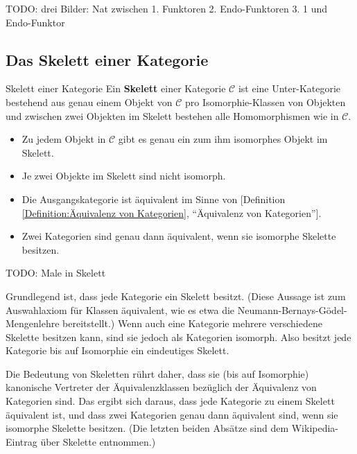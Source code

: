 \documentclass[a4paper]{amsart}
\theoremstyle{definition}
\newcommand{\myRef}[2]{[#1 \ref{#1:#2}, ``#2'']}
\newcommand{\CC}{\ensuremath{\mathcal{ C }}}
\begin{document}
TODO: drei Bilder: Nat zwischen 1. Funktoren 2. Endo-Funktoren 3. 1 und Endo-Funktor


\subsection{Das Skelett einer Kategorie}
\begin{Definition}{Skelett einer Kategorie}
   Ein \textbf{Skelett} einer Kategorie $\CC$ ist eine Unter-Kategorie bestehend aus genau einem Objekt von $\CC$ pro Isomorphie-Klassen von Objekten und zwischen zwei Objekten im Skelett bestehen alle Homomorphismen wie in $\CC$.
\end{Definition}

\begin{itemize}
   \item Zu jedem Objekt in $\CC$ gibt es genau ein zum ihm isomorphes Objekt im Skelett.
   \item Je zwei Objekte im Skelett sind nicht isomorph.
   \item Die Ausgangskategorie ist äquivalent im Sinne von \myRef{Definition}{Äquivalenz von Kategorien}.
   \item Zwei Kategorien sind genau dann äquivalent, wenn sie isomorphe Skelette besitzen.
\end{itemize}

TODO: Male in Skelett

Grundlegend ist, dass jede Kategorie ein Skelett besitzt. (Diese Aussage ist zum Auswahlaxiom für Klassen äquivalent, wie es etwa die Neumann-Bernays-Gödel-Mengenlehre bereitstellt.) Wenn auch eine Kategorie mehrere verschiedene Skelette besitzen kann, sind sie jedoch als Kategorien isomorph. Also besitzt jede Kategorie bis auf Isomorphie ein eindeutiges Skelett.

Die Bedeutung von Skeletten rührt daher, dass sie (bis auf Isomorphie) kanonische Vertreter der Äquivalenzklassen bezüglich der Äquivalenz von Kategorien sind. Das ergibt sich daraus, dass jede Kategorie zu einem Skelett äquivalent ist, und dass zwei Kategorien genau dann äquivalent sind, wenn sie isomorphe Skelette besitzen. (Die letzten beiden Absätze sind dem Wikipedia-Eintrag über Skelette entnommen.)
\end{document}
